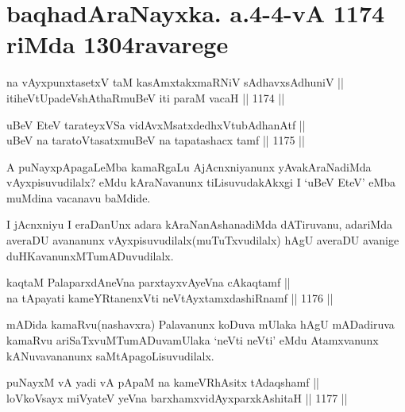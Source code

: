 \section*{baqhadAraNayxka. a.4-4-vA 1174 riMda 1304ravarege}

\begin{shl}
na vAyxpunxtasetxV taM kasAmxtakxmaRNiV sAdhavxsAdhuniV || \\
itiheVtUpadeVshAthaRmuBeV iti paraM vacaH ||  1174 ||  
\end{shl}
				
\begin{shl}
uBeV EteV tarateyxVSa vidAvxMsatxdedhxVtubAdhanAtf || \\
uBeV na taratoV\s tasatxmuBeV na tapatashacx tamf ||  1175 ||  
\end{shl}

\begin{artha}
A puNayxpApagaLeMba kamaRgaLu AjAcnxniyanunx yAvakAraNadiMda vAyxpisuvudilalx? eMdu 
kAraNavanunx tiLisuvudakAkxgi I `uBeV EteV' eMba muMdina vacanavu baMdide.
\end{artha}

\begin{artha}
I jAcnxniyu I eraDanUnx adara kAraNanAshanadiMda dATiruvanu, adariMda averaDU avananunx vAyxpisuvudilalx(muTuTxvudilalx) hAgU averaDU avanige duHKavanunxMTumADuvudilalx.
\end{artha}


\begin{shl}
kaqtaM PalaparxdAneVna parxtayxvAyeVna cAkaqtamf ||  \\
na tApayati kameYRtanenxVti neVtAyxtamxdashiRnamf ||  1176 ||  
\end{shl}

\begin{artha}
mADida kamaRvu(nashavxra) Palavanunx koDuva mUlaka hAgU mADadiruva kamaRvu ariSaTxvuMTumADuvamUlaka `neVti neVti' eMdu Atamxvanunx kANuvavananunx saMtApagoLisuvudilalx.
\end{artha}


\begin{shl}
puNayxM vA yadi vA pApaM na kameVRhAsitx tAdaqshamf ||  \\
loVkoV\s sayx miVyateV yeVna barxhamxvidAyxparxkAshitaH ||  1177 ||  
\end{shl}

